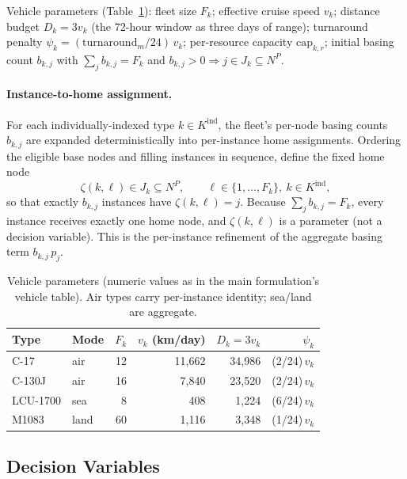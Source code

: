 Vehicle parameters (Table~\ref{tab:vif:params}): fleet size $F_k$; effective
cruise speed $v_k$; distance budget $D_k = 3 v_k$ (the 72-hour window as three
days of range); turnaround penalty
$\psi_k = (\text{turnaround}_m / 24)\, v_k$; per-resource capacity
$\text{cap}_{k,r}$; initial basing count $b_{k,j}$ with
$\sum_{j} b_{k,j} = F_k$ and $b_{k,j} > 0 \Rightarrow j \in J_k \subseteq N^P$.

\paragraph{Instance-to-home assignment.}
For each individually-indexed type $k \in K^{\mathrm{ind}}$, the fleet's
per-node basing counts $b_{k,j}$ are expanded deterministically into
per-instance home assignments. Ordering the eligible base nodes and filling
instances in sequence, define the fixed home node
\begin{equation}
\zeta(k,\ell) \in J_k \subseteq N^P,
\qquad \ell \in \{1,\dots,F_k\},\ k \in K^{\mathrm{ind}},
\label{eq:vif:home}
\end{equation}
so that exactly $b_{k,j}$ instances have $\zeta(k,\ell) = j$. Because
$\sum_j b_{k,j} = F_k$, every instance receives exactly one home node, and
$\zeta(k,\ell)$ is a parameter (not a decision variable). This is the
per-instance refinement of the aggregate basing term $b_{k,j}\,p_j$.

\begin{table}[t]
\centering
\caption{Vehicle parameters (numeric values as in the main formulation's
vehicle table). Air types carry per-instance identity; sea/land are
aggregate.}
\label{tab:vif:params}
\begin{tabular}{llrrrr}
\hline
Type & Mode & $F_k$ & $v_k$ (km/day) & $D_k = 3v_k$ & $\psi_k$ \\
\hline
C-17     & air  & 12 & 11{,}662 & 34{,}986 & (2/24)$\,v_k$ \\
C-130J   & air  & 16 & 7{,}840  & 23{,}520 & (2/24)$\,v_k$ \\
LCU-1700 & sea  & 8  & 408      & 1{,}224  & (6/24)$\,v_k$ \\
M1083    & land & 60 & 1{,}116  & 3{,}348  & (1/24)$\,v_k$ \\
\hline
\end{tabular}
\end{table}

\subsection{Decision Variables}
\label{sec:vif:vars}

